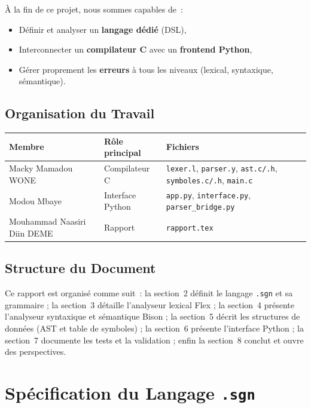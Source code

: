 \documentclass[a4paper,12pt]{article}
\begin{document}
À la fin de ce projet, nous sommes capables de~:
\begin{itemize}[leftmargin=1.5em]
  \item Définir et analyser un \textbf{langage dédié} (DSL),
  \item Interconnecter un \textbf{compilateur C} avec un \textbf{frontend Python},
  \item Gérer proprement les \textbf{erreurs} à tous les niveaux (lexical, syntaxique, sémantique).
\end{itemize}

\subsection{Organisation du Travail}

\begin{tabular}{lll}
\toprule
\textbf{Membre} & \textbf{Rôle principal} & \textbf{Fichiers} \\
\midrule
Macky Mamadou WONE & Compilateur C & \texttt{lexer.l}, \texttt{parser.y}, \texttt{ast.c/.h}, \texttt{symboles.c/.h}, \texttt{main.c} \\
Modou Mbaye & Interface Python & \texttt{app.py}, \texttt{interface.py}, \texttt{parser\_bridge.py} \\
Mouhammad Naasiri Diin DEME & Rapport & \texttt{rapport.tex} \\
\bottomrule
\end{tabular}

\subsection{Structure du Document}

Ce rapport est organisé comme suit~: la section~2 définit le langage \texttt{.sgn} et sa grammaire ; la section~3 détaille l'analyseur lexical Flex ; la section~4 présente l'analyseur syntaxique et sémantique Bison ; la section~5 décrit les structures de données (AST et table de symboles) ; la section~6 présente l'interface Python ; la section~7 documente les tests et la validation ; enfin la section~8 conclut et ouvre des perspectives.

\section{Spécification du Langage \texttt{.sgn}}
\end{document}
